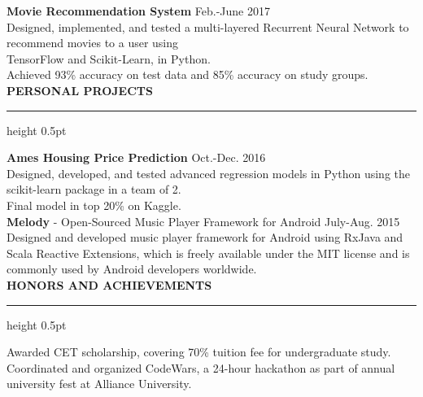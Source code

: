 \documentclass[a4paper]{article}
\newcommand{\myline}{\par
  \kern2pt %
  \hrule height 0.5pt
  \kern2pt %
}
\newcommand{\mybullet}{
	\indent \textbullet \hspace*{2mm}
}
\begin{document}
        \noindent
        \textbf{Movie Recommendation System} \hfill Feb.-June 2017\\
        \mybullet Designed, implemented, and tested a multi-layered Recurrent Neural Network 
        to recommend movies to a user using \\ \indent\indent TensorFlow and Scikit-Learn, 
        in Python. \\
        \mybullet Achieved 93\% accuracy on test data and 85\% accuracy on study groups. \\

	\noindent
	{\large \textbf{PERSONAL PROJECTS}}
	\myline 
	\smallskip
	
	\noindent
	\textbf{Ames Housing Price Prediction} \hfill Oct.-Dec. 2016 \\
	\mybullet Designed, developed, and tested advanced regression models in Python using 
        the scikit-learn package in a team of 2. \\
	\mybullet Final model in top 20\% on Kaggle. \\
	
	\noindent
	\textbf{Melody} - Open-Sourced Music Player Framework for Android \hfill July-Aug. 2015 \\
	\mybullet Designed and developed music player framework for Android using RxJava and 
        Scala Reactive Extensions, which is freely \indent\indent available under the MIT license 
        and is commonly used by Android developers worldwide. \\
	
	\noindent
	{\large \textbf{HONORS AND ACHIEVEMENTS}}
	\myline 
	\smallskip

        \mybullet Awarded CET scholarship, covering 70\% tuition fee for undergraduate study. \\
        \mybullet Coordinated and organized CodeWars, a 24-hour hackathon as part of annual 
        university fest at Alliance University. \\
		
	
\end{document}

